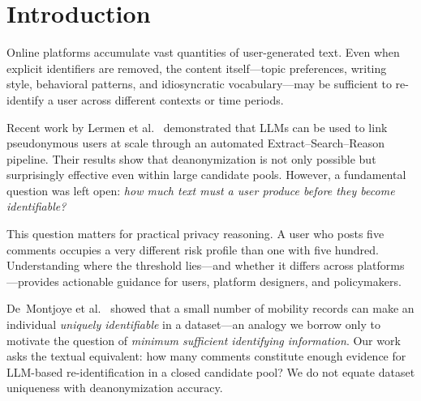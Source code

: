 \documentclass[sigplan,screen,nonacm]{acmart}
\begin{document}
\section{Introduction}


Online platforms accumulate vast quantities of user-generated text. Even when
explicit identifiers are removed, the content itself---topic preferences, writing
style, behavioral patterns, and idiosyncratic vocabulary---may be sufficient to
re-identify a user across different contexts or time periods.

Recent work by Lermen et al.~\cite{lermen2026} demonstrated that LLMs can be used
to link pseudonymous users at scale through an automated Extract--Search--Reason
pipeline. Their results show that deanonymization is not only possible but
surprisingly effective even within large candidate pools. However, a fundamental
question was left open: \textit{how much text must a user produce before they
become identifiable?}

This question matters for practical privacy reasoning. A user who posts five
comments occupies a very different risk profile than one with five hundred. Understanding
where the threshold lies---and whether it differs across platforms---provides
actionable guidance for users, platform designers, and policymakers.

De~Montjoye et al.~\cite{demontjoye2013} showed that a small number of mobility
records can make an individual \emph{uniquely identifiable} in a dataset---an analogy
we borrow only to motivate the question of \emph{minimum sufficient identifying
information}. Our work asks the textual equivalent: how many comments constitute
enough evidence for LLM-based re-identification in a closed candidate pool? We do
not equate dataset uniqueness with deanonymization accuracy.
\end{document}
